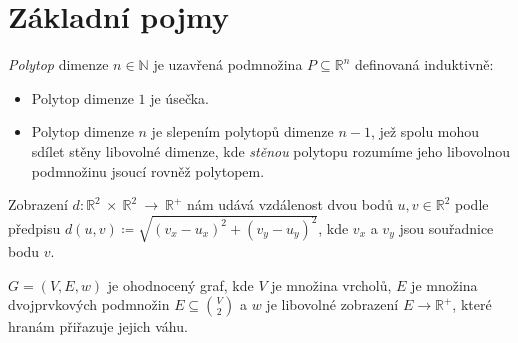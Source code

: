 \chapter{Základní pojmy}
\label{chap:zakladni-pojmy}

\begin{definition}[Polytop]
    \emph{Polytop} dimenze $n \in \mathbb{N}$ je uzavřená podmnožina $P \subseteq \mathbb{R}^{n}$ definovaná induktivně:
    \begin{itemize}
        \item Polytop dimenze $1$ je úsečka.
        \item Polytop dimenze $n$ je slepením polytopů dimenze $n-1$, jež spolu mohou
            sdílet stěny libovolné dimenze, kde \emph{stěnou} polytopu rozumíme jeho
            libovolnou podmnožinu jsoucí rovněž polytopem. \autocite{adamklepacDefinicePolytopu2024}
    \end{itemize}
    
\end{definition}

\begin{definition}[Vzdálenost]
    \label{definice:vzdalenost}
    Zobrazení $d: \mathbb{R}^2~\times~\mathbb{R}^2~\rightarrow~\mathbb{R}^+$ nám udává vzdálenost dvou bodů $u, v \in \mathbb{R}^2$ podle předpisu $d(u, v) \coloneqq \sqrt{(v_x-u_x)^2+(v_y-u_y)^2}$, kde $v_x$ a $v_y$ jsou souřadnice bodu $v$. 
\end{definition}

\begin{definition}
    \label{definice:ohodnoceny_graf}
    $G = (V, E, w)$ je ohodnocený graf, kde $V$ je množina vrcholů, $E$ je množina dvojprvkových podmnožin $E \subseteq \binom{V}{2}$ a $w$ je libovolné zobrazení $E \rightarrow \mathds{R}^+$, které hranám přiřazuje jejich váhu.
\end{definition}

